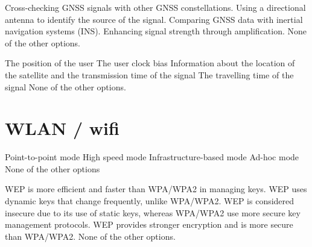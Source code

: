 \begin{questions}
    \begin{checkboxes}
        \CorrectChoice Cross-checking GNSS signals with other GNSS constellations.
        \CorrectChoice Using a directional antenna to identify the source of the signal.
        \CorrectChoice Comparing GNSS data with inertial navigation systems (INS).
        \choice Enhancing signal strength through amplification.
        \choice None of the other options.
    \end{checkboxes}

    \begin{checkboxes}
        \choice The position of the user
        \choice The user clock bias
        \CorrectChoice Information about the location of the satellite and the transmission time of the signal
        \choice The travelling time of the signal
        \choice None of the other options.
    \end{checkboxes}



    \section{WLAN / wifi}

    \begin{checkboxes}
        \choice Point-to-point mode
        \choice High speed mode
        \CorrectChoice Infrastructure-based mode
        \CorrectChoice Ad-hoc mode
        \choice None of the other options

    \end{checkboxes}




    \begin{checkboxes}
        \choice WEP is more efficient and faster than WPA/WPA2 in managing keys.
        \choice WEP uses dynamic keys that change frequently, unlike WPA/WPA2.
        \CorrectChoice WEP is considered insecure due to its use of static keys, whereas WPA/WPA2 use more secure key management protocols.
        \choice WEP provides stronger encryption and is more secure than WPA/WPA2.
        \choice None of the other options.
    \end{checkboxes}


\end{questions}
